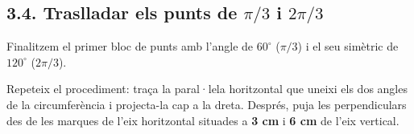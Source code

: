 \documentclass[12pt,a4paper]{article}
\begin{document}
\begin{center}
\end{center}

\newpage
\subsection*{3.4. Traslladar els punts de $\pi/3$ i $2\pi/3$}

Finalitzem el primer bloc de punts amb l'angle de $60^\circ$ ($\pi/3$) i el seu simètric de $120^\circ$ ($2\pi/3$). 

Repeteix el procediment: traça la paral·lela horitzontal que uneixi els dos angles de la circumferència i projecta-la cap a la dreta. Després, puja les perpendiculars des de les marques de l'eix horitzontal situades a \textbf{3 cm} i \textbf{6 cm} de l'eix vertical.
\end{document}
